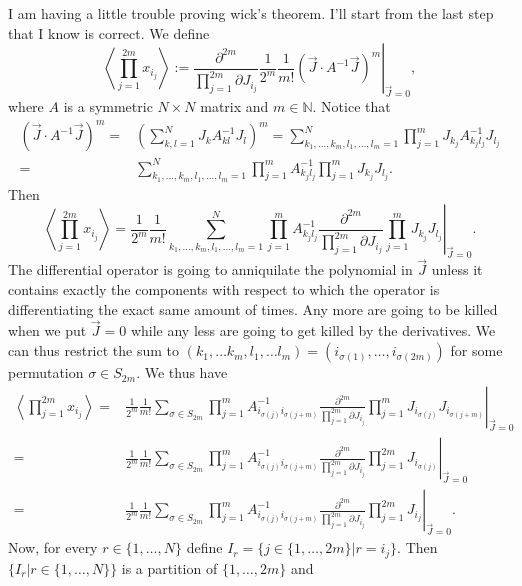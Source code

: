 \documentclass{article}
\begin{document}
I am having a little trouble proving wick's theorem. I'll start from the last step that I know is correct. We define
$$\left\langle \prod_{j=1}^{2m}x_{i_j}\right\rangle:=\left.\frac{\partial^{2m}}{\prod_{j=1}^{2m}\partial J_{i_j}}\frac{1}{2^m}\frac{1}{m!}\left(\vec{J}\cdot A^{-1}\vec{J}\right)^m\right|_{\vec{J}=0},$$
where $A$ is a symmetric $N\times N$ matrix and $m\in\mathbb{N}$. Notice that
$$\begin{aligned}
\left(\vec{J}\cdot A^{-1}\vec{J}\right)^m=&\left(\sum_{k,l=1}^N J_kA^{-1}_{kl}J_l\right)^m=\sum_{k_1,\dots,k_m,l_1,\dots,l_m=1}^N\prod_{j=1}^m J_{k_j}A^{-1}_{k_jl_j}J_{l_j}\\
=&\sum_{k_1,\dots,k_m,l_1,\dots,l_m=1}^N\prod_{j=1}^m A^{-1}_{k_jl_j}\prod_{j=1}^m J_{k_j}J_{l_j}.\end{aligned}$$
Then 
$$\left\langle \prod_{j=1}^{2m}x_{i_j}\right\rangle=\left.\frac{1}{2^m}\frac{1}{m!}\sum_{k_1,\dots,k_m,l_1,\dots,l_m=1}^N\prod_{j=1}^m A^{-1}_{k_jl_j}\frac{\partial^{2m}}{\prod_{j=1}^{2m}\partial J_{i_j}}\prod_{j=1}^m J_{k_j}J_{l_j}\right|_{\vec{J}=0}.$$
The differential operator is going to anniquilate the polynomial in $\vec{J}$ unless it contains exactly the components with respect to which the operator is differentiating the exact same amount of times. Any more are going to be killed when we put $\vec{J}=0$ while any less are going to get killed by the derivatives. We can thus restrict the sum to $(k_1,\dots k_m,l_1,\dots l_m)=(i_{\sigma(1)},\dots,i_{\sigma(2m)})$ for some permutation $\sigma\in S_{2m}$. We thus have
$$\begin{aligned}\left\langle \prod_{j=1}^{2m}x_{i_j}\right\rangle=&\left.\frac{1}{2^m}\frac{1}{m!}\sum_{\sigma\in S_{2m}}\prod_{j=1}^m A^{-1}_{i_{\sigma(j)}i_{\sigma(j+m)}}\frac{\partial^{2m}}{\prod_{j=1}^{2m}\partial J_{i_j}}\prod_{j=1}^m J_{i_{\sigma(j)}}J_{i_{\sigma(j+m)}}\right|_{\vec{J}=0}\\
=&\left.\frac{1}{2^m}\frac{1}{m!}\sum_{\sigma\in S_{2m}}\prod_{j=1}^m A^{-1}_{i_{\sigma(j)}i_{\sigma(j+m)}}\frac{\partial^{2m}}{\prod_{j=1}^{2m}\partial J_{i_j}}\prod_{j=1}^{2m} J_{i_{\sigma(j)}}\right|_{\vec{J}=0}\\
=&\left.\frac{1}{2^m}\frac{1}{m!}\sum_{\sigma\in S_{2m}}\prod_{j=1}^m A^{-1}_{i_{\sigma(j)}i_{\sigma(j+m)}}\frac{\partial^{2m}}{\prod_{j=1}^{2m}\partial J_{i_j}}\prod_{j=1}^{2m} J_{i_j}\right|_{\vec{J}=0}.\end{aligned}$$
Now, for every $r\in\{1,\dots,N\}$ define $I_r=\{j\in\{1,\dots,2m\}|r=i_j\}.$ Then $\{I_r|r\in\{1,\dots,N\}\}$ is a partition of $\{1,\dots,2m\}$ and
\end{document}
